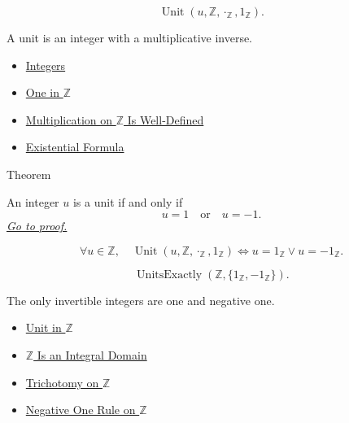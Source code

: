 \begin{remark*}
\[
\operatorname{Unit}(u,\mathbb{Z},\cdot_{\mathbb{Z}},1_{\mathbb{Z}}).
\]
\end{remark*}

\begin{remark*}[Interpretation]
A unit is an integer with a multiplicative inverse.
\end{remark*}

\begin{dependencies}
\begin{itemize}
  \item \hyperref[def:integers]{Integers}
  \item \hyperref[def:one-in-z]{One in $\mathbb{Z}$}
  \item \hyperref[thm:multiplication-on-z-well-defined]{Multiplication on $\mathbb{Z}$ Is Well-Defined}
  \item \hyperref[def:existential-q]{Existential Formula}
\end{itemize}
\end{dependencies}

\begin{theorembox}{Theorem}
\begin{theorem}
\label{thm:units-of-z-are-pm-one}
An integer $u$ is a unit if and only if
\[
u=1\quad\text{or}\quad u=-1.
\]
\hyperref[prf:units-of-z-are-pm-one]{\textit{Go to proof.}}
\end{theorem}
\end{theorembox}

\begin{remark*}
\[
\forall u\in\mathbb{Z},\quad
\operatorname{Unit}(u,\mathbb{Z},\cdot_{\mathbb{Z}},1_{\mathbb{Z}})
\Longleftrightarrow
u=1_{\mathbb{Z}}\lor u=-1_{\mathbb{Z}}.
\]
\end{remark*}

\begin{remark*}
\[
\operatorname{UnitsExactly}(\mathbb{Z},\{1_{\mathbb{Z}},-1_{\mathbb{Z}}\}).
\]
\end{remark*}

\begin{remark*}[Interpretation]
The only invertible integers are one and negative one.
\end{remark*}

\begin{dependencies}
\begin{itemize}
  \item 
\hyperref[def:unit-in-z]{Unit in $\mathbb{Z}$}
  \item \hyperref[thm:z-integral-domain]{$\mathbb{Z}$ Is an Integral Domain}
  \item \hyperref[thm:trichotomy-on-z]{Trichotomy on $\mathbb{Z}$}
  \item \hyperref[cor:negative-one-rule-on-z]{Negative One Rule on $\mathbb{Z}$}
\end{itemize}
\end{dependencies}

